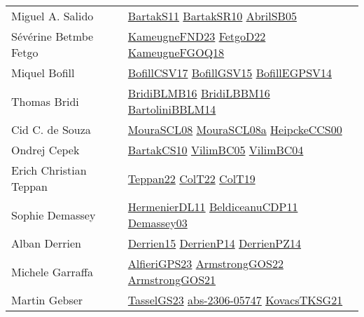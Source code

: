 {\begin{longtable}{p{4cm}p{20cm}}
Miguel A. Salido & \href{articles/BartakS11.pdf}{BartakS11}\cite{BartakS11} \href{articles/BartakSR10.pdf}{BartakSR10}\cite{BartakSR10} \href{papers/AbrilSB05.pdf}{AbrilSB05}\cite{AbrilSB05} \\
S{\'{e}}v{\'{e}}rine Betmbe Fetgo & \href{papers/KameugneFND23.pdf}{KameugneFND23}\cite{KameugneFND23} \href{articles/FetgoD22.pdf}{FetgoD22}\cite{FetgoD22} \href{papers/KameugneFGOQ18.pdf}{KameugneFGOQ18}\cite{KameugneFGOQ18} \\
Miquel Bofill & \href{papers/BofillCSV17.pdf}{BofillCSV17}\cite{BofillCSV17} \href{papers/BofillGSV15.pdf}{BofillGSV15}\cite{BofillGSV15} \href{papers/BofillEGPSV14.pdf}{BofillEGPSV14}\cite{BofillEGPSV14} \\
Thomas Bridi & \href{articles/BridiBLMB16.pdf}{BridiBLMB16}\cite{BridiBLMB16} \href{papers/BridiLBBM16.pdf}{BridiLBBM16}\cite{BridiLBBM16} \href{papers/BartoliniBBLM14.pdf}{BartoliniBBLM14}\cite{BartoliniBBLM14} \\
Cid C. de Souza & \href{papers/MouraSCL08.pdf}{MouraSCL08}\cite{MouraSCL08} \href{papers/MouraSCL08a.pdf}{MouraSCL08a}\cite{MouraSCL08a} \href{articles/HeipckeCCS00.pdf}{HeipckeCCS00}\cite{HeipckeCCS00} \\
Ondrej Cepek & \href{articles/BartakCS10.pdf}{BartakCS10}\cite{BartakCS10} \href{articles/VilimBC05.pdf}{VilimBC05}\cite{VilimBC05} \href{papers/VilimBC04.pdf}{VilimBC04}\cite{VilimBC04} \\
Erich Christian Teppan & \href{papers/Teppan22.pdf}{Teppan22}\cite{Teppan22} \href{articles/ColT22.pdf}{ColT22}\cite{ColT22} \href{papers/ColT19.pdf}{ColT19}\cite{ColT19} \\
Sophie Demassey & \href{papers/HermenierDL11.pdf}{HermenierDL11}\cite{HermenierDL11} \href{articles/BeldiceanuCDP11.pdf}{BeldiceanuCDP11}\cite{BeldiceanuCDP11} \href{}{Demassey03}\cite{Demassey03} \\
Alban Derrien & \href{}{Derrien15}\cite{Derrien15} \href{papers/DerrienP14.pdf}{DerrienP14}\cite{DerrienP14} \href{papers/DerrienPZ14.pdf}{DerrienPZ14}\cite{DerrienPZ14} \\
Michele Garraffa & \href{articles/AlfieriGPS23.pdf}{AlfieriGPS23}\cite{AlfieriGPS23} \href{papers/ArmstrongGOS22.pdf}{ArmstrongGOS22}\cite{ArmstrongGOS22} \href{papers/ArmstrongGOS21.pdf}{ArmstrongGOS21}\cite{ArmstrongGOS21} \\
Martin Gebser & \href{papers/TasselGS23.pdf}{TasselGS23}\cite{TasselGS23} \href{articles/abs-2306-05747.pdf}{abs-2306-05747}\cite{abs-2306-05747} \href{papers/KovacsTKSG21.pdf}{KovacsTKSG21}\cite{KovacsTKSG21} \\

\end{longtable}}
